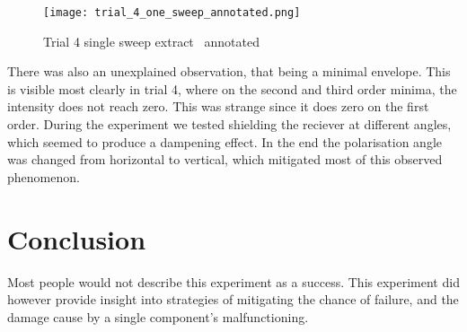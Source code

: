 \begin{wrapfigure}{r}{0.45\textwidth}
	\centering
	\texttt{[image: trial\_4\_one\_sweep\_annotated.png]}
	\caption{Trial 4 single sweep extract \textemdash \, annotated}
\end{wrapfigure} 
There was also an unexplained observation, that being a minimal envelope. This is visible most clearly in trial 4, where on the second and third order minima, the intensity does not reach zero. This was strange since it does zero on the first order. During the experiment we tested shielding the reciever at different angles, which seemed to produce a dampening effect. In the end the polarisation angle was changed from horizontal to vertical, which mitigated most of this observed phenomenon.

\section*{Conclusion}

Most people would not describe this experiment as a success.
This experiment did however provide insight into strategies of mitigating the chance of failure, and the damage cause by a single component's malfunctioning.




